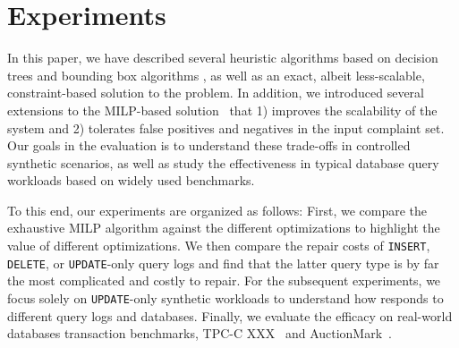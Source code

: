 
%
%
%
%
%
\section{Experiments}

In this paper, we have described several heuristic algorithms based on decision trees 
and bounding box algorithms , as well as an exact, albeit less-scalable,
constraint-based solution to the \prob problem.  In addition, we 
introduced  several extensions to the MILP-based solution~ that 
1) improves the scalability of the system and 2) tolerates false positives and 
negatives in the input complaint set.
Our goals in the evaluation is to understand these trade-offs in
controlled synthetic scenarios, as well as study the effectiveness
in typical database query workloads based on widely used benchmarks.

To this end, our experiments are organized as follows: First, 
we compare the exhaustive MILP algorithm against the different optimizations 
to highlight the value of different optimizations.  We then compare the
repair costs of \texttt{INSERT}, \texttt{DELETE}, or \texttt{UPDATE}-only query logs 
and find that the latter query type is by far the most complicated and costly to repair.
For the subsequent experiments, we focus solely on \texttt{UPDATE}-only synthetic workloads 
to understand how \sys responds to different query logs and databases.  
Finally, we evaluate the efficacy on real-world databases transaction benchmarks,
TPC-C XXX~\cite{tpcc} and AuctionMark~\cite{auctionmark}.







